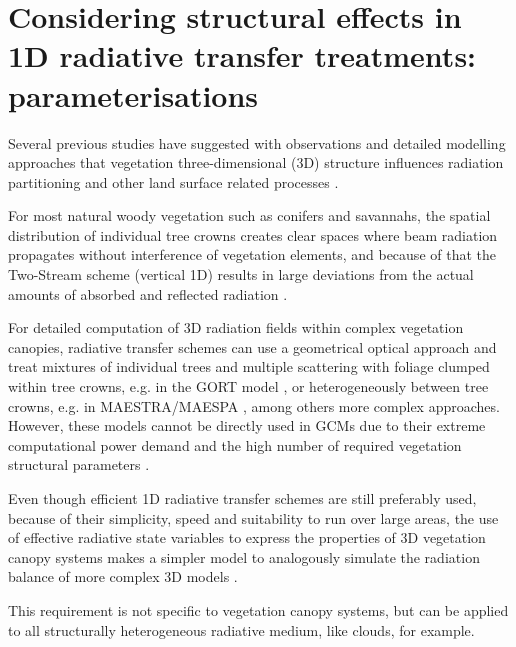 \documentclass[a4paper,11pt]{report}
\begin{document}
\section{Considering structural effects in 1D radiative transfer treatments: parameterisations}\label{section:parameterisations}
Several previous studies have suggested with observations and detailed modelling approaches that vegetation three-dimensional (3D) structure influences radiation partitioning and other land surface related processes \citep{Nilson1971,Wang1990,Chen1996,Kucharik1999,Yang2001,Yang2003,Jonckheere2004,pinty2006,Chen2008,Ni-Meister2010,Widlowski2011,Kobayashi2012,Loew2014}.

For most natural woody vegetation such as conifers and savannahs, the spatial distribution of individual tree crowns creates clear spaces where beam radiation propagates without interference of vegetation elements, and because of that the Two-Stream scheme (vertical 1D) results in large deviations from the actual amounts of absorbed and reflected radiation \citep{Ni-Meister2010,Kobayashi2012,Loew2014}.

For detailed computation of 3D radiation fields within complex vegetation canopies, radiative transfer schemes can use a geometrical optical approach and treat mixtures of individual trees and multiple scattering with foliage clumped within tree crowns, e.g. in the GORT model \citep{Li1995}, or heterogeneously between tree crowns, e.g. in MAESTRA/MAESPA \citep{Wang1990,Duursma2012}, among others more complex approaches. However, these models cannot be directly used in GCMs due to their extreme computational power demand \citep{Yang2001} and the high number of required vegetation structural parameters \citep{Loew2014}. 

Even though efficient 1D radiative transfer schemes are still preferably used, because of their simplicity, speed and suitability to run over large areas, the use of effective radiative state variables to express the properties of 3D vegetation canopy systems makes a simpler model to analogously simulate the radiation balance of more complex 3D models \citep{Pinty2004,pinty2006}. 

This requirement is not specific to vegetation canopy systems, but can be applied to all structurally heterogeneous radiative medium, like clouds, for example.
\end{document}
